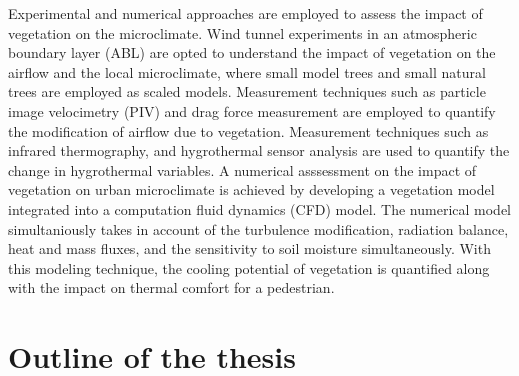 Experimental and numerical approaches are employed to assess the impact of vegetation on the microclimate. Wind tunnel experiments in an atmospheric boundary layer (ABL) are opted to understand the impact of vegetation on the airflow and the local microclimate, where small model trees and small natural trees are employed as scaled models. Measurement techniques such as particle image velocimetry (PIV) and drag force measurement are employed to quantify the modification of airflow due to vegetation. Measurement techniques such as infrared thermography, and hygrothermal sensor analysis are used to quantify the change in hygrothermal variables. A numerical asssessment on the impact of vegetation on urban microclimate is achieved by developing a vegetation model integrated into a computation fluid dynamics  (CFD) model. The numerical model simultaniously takes in account of the turbulence modification, radiation balance, heat and mass fluxes, and the sensitivity to soil moisture simultaneously. With this modeling technique, the cooling potential of vegetation is quantified along with the impact on thermal comfort for a pedestrian. 

\section{Outline of the thesis}

